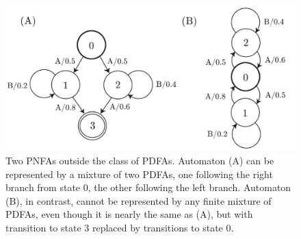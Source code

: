 \begin{figure}
\begin{center}
\includegraphics[scale=0.6]{pnfa.pdf}
\caption{Two PNFAs outside the class of PDFAs.  Automaton (A) can be represented by a mixture of two PDFAs, one following the right branch from state 0, the other following the left branch.  Automaton (B), in contrast, cannot be represented by any finite mixture of PDFAs, even though it is nearly the same as (A), but with transition to state 3 replaced by transitions to state 0.}
\label{pnfa}
\end{center}
\end{figure}